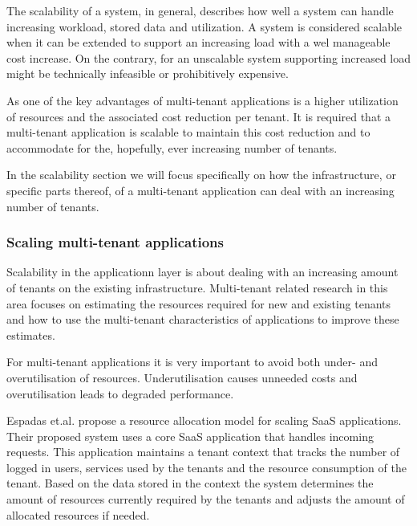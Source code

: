 The scalability of a system, in general, describes how well a system can handle increasing workload, stored data and utilization.
A system is considered scalable when it can be extended to support an increasing load with a wel manageable cost increase.
On the contrary, for an unscalable system supporting increased load might be technically infeasible or prohibitively expensive.\cite{bondi2000scalability}

As one of the key advantages of multi-tenant applications is a higher utilization of resources and the associated cost reduction per tenant.\cite{bezemer2010multi} 
It is required that a multi-tenant application is scalable to maintain this cost reduction and to accommodate for the, hopefully, ever increasing number of tenants.

In the scalability section we will focus specifically on how the infrastructure, or specific parts thereof, of a multi-tenant application can deal with an increasing number of tenants.

\subsubsection{Scaling multi-tenant applications}
Scalability in the applicationn layer is about dealing with an increasing amount of tenants on the existing infrastructure.
Multi-tenant related research in this area focuses on estimating the resources required for new and existing tenants and how to use the multi-tenant characteristics of applications to improve these estimates. 

For multi-tenant applications it is very important to avoid both under- and overutilisation of resources.
Underutilisation causes unneeded costs and overutilisation leads to degraded performance.

Espadas et.al. \cite{espadas2013tenant} propose a resource allocation model for scaling SaaS applications.
Their proposed system uses a core SaaS application that handles incoming requests.
This application maintains a tenant context that tracks the number of logged in users, services used by the tenants and the resource consumption of the tenant.
Based on the data stored in the context the system determines the amount of resources currently required by the tenants and adjusts the amount of allocated resources if needed.

